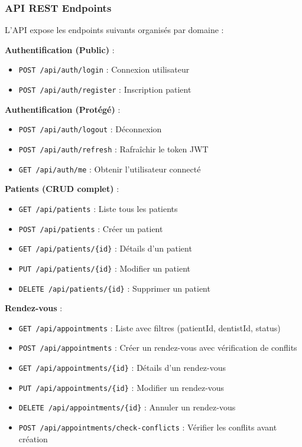 \documentclass[12pt,a4paper]{report}
\begin{document}
\subsubsection{API REST Endpoints}

L'API expose les endpoints suivants organisés par domaine :

\textbf{Authentification (Public)} :
\begin{itemize}
    \item \texttt{POST /api/auth/login} : Connexion utilisateur
    \item \texttt{POST /api/auth/register} : Inscription patient
\end{itemize}

\textbf{Authentification (Protégé)} :
\begin{itemize}
    \item \texttt{POST /api/auth/logout} : Déconnexion
    \item \texttt{POST /api/auth/refresh} : Rafraîchir le token JWT
    \item \texttt{GET /api/auth/me} : Obtenir l'utilisateur connecté
\end{itemize}

\textbf{Patients (CRUD complet)} :
\begin{itemize}
    \item \texttt{GET /api/patients} : Liste tous les patients
    \item \texttt{POST /api/patients} : Créer un patient
    \item \texttt{GET /api/patients/\{id\}} : Détails d'un patient
    \item \texttt{PUT /api/patients/\{id\}} : Modifier un patient
    \item \texttt{DELETE /api/patients/\{id\}} : Supprimer un patient
\end{itemize}

\textbf{Rendez-vous} :
\begin{itemize}
    \item \texttt{GET /api/appointments} : Liste avec filtres (patientId, dentistId, status)
    \item \texttt{POST /api/appointments} : Créer un rendez-vous avec vérification de conflits
    \item \texttt{GET /api/appointments/\{id\}} : Détails d'un rendez-vous
    \item \texttt{PUT /api/appointments/\{id\}} : Modifier un rendez-vous
    \item \texttt{DELETE /api/appointments/\{id\}} : Annuler un rendez-vous
    \item \texttt{POST /api/appointments/check-conflicts} : Vérifier les conflits avant création
\end{itemize}
\end{document}
